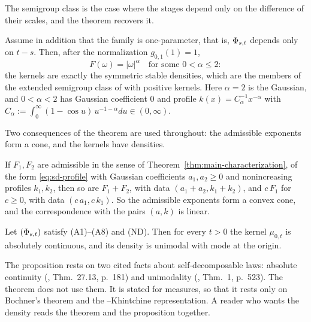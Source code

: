The semigroup class is the case where the stages depend only on the difference of their
scales, and the theorem recovers it.

\begin{corollary}\label{cor:semigroup-case}
Assume in addition that the family is one-parameter, that is, $\Phi_{s,t}$ depends only on
$t - s$. Then, after the normalization $g_{0,1}(1) = 1$,
\[
  F(\omega) = |\omega|^\alpha \quad \text{for some } 0 < \alpha \le 2 :
\]
the kernels are exactly the symmetric stable densities, which are the members of the extended
semigroup class of  with positive kernels. Here $\alpha = 2$ is the
Gaussian, and $0 < \alpha < 2$ has Gaussian coefficient $0$ and profile
$k(x) = C_\alpha^{-1}x^{-\alpha}$ with
$C_\alpha := \int_0^\infty (1 - \cos u)\,u^{-1-\alpha}du \in (0,\infty)$.
\end{corollary}

Two consequences of the theorem are used throughout: the admissible exponents form a cone, and
the kernels have densities.

\begin{lemma}\label{lem:admissible-cone}
If $F_1, F_2$ are admissible in the sense of Theorem~\ref{thm:main-characterization}, of the
form \ref{eq:sd-profile} with Gaussian coefficients $a_1, a_2 \ge 0$ and nonincreasing profiles
$k_1, k_2$, then so are $F_1 + F_2$, with data $(a_1+a_2, k_1+k_2)$, and $c\,F_1$ for $c \ge 0$,
with data $(c\,a_1, c\,k_1)$. So the admissible exponents form a convex cone, and the
correspondence with the pairs $(a,k)$ is linear.
\end{lemma}

\begin{proposition}\label{prop:kernel-regularity}
Let $(\Phi_{s,t})$ satisfy (A1)--(A8) and (ND). Then for every $t > 0$ the kernel $\mu_{0,t}$
is absolutely continuous, and its density is unimodal with mode at the origin.
\end{proposition}

The proposition rests on two cited facts about self-decomposable laws: absolute continuity
(, Thm.~27.13, p.~181) and unimodality
(, Thm.~1, p.~523). The theorem does not use them. It is
stated for measures, so that it rests only on Bochner's theorem and the \Levy--Khintchine
representation. A reader who wants the density reads the theorem and the proposition together.


